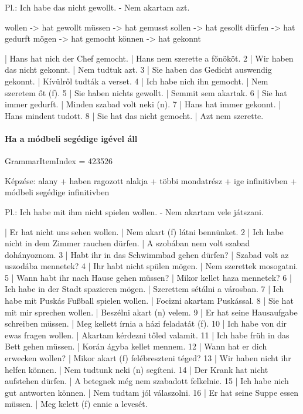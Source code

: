 \documentclass{article}
\newenvironment{desc}{\verbatim}{\endverbatim}
\newenvironment{exmp}{\verbatim}{\endverbatim}
\begin{document}
\begin{desc}
Pl.: Ich habe das nicht gewollt. - Nem akartam azt.

wollen -> hat gewollt
müssen -> hat gemusst
sollen -> hat gesollt
dürfen -> hat gedurft
mögen -> hat gemocht
können -> hat gekonnt
\end{desc}

\begin{exmp}
1 | Hans hat nich der Chef gemocht. | Hans nem szerette a főnököt.
2 | Wir haben das nicht gekonnt. | Nem tudtuk azt.
3 | Sie haben das Gedicht auswendig gekonnt. | Kívülről tudták a verset.
4 | Ich habe nich ihn gemocht. | Nem szeretem őt (f).
5 | Sie haben nichts gewollt. | Semmit sem akartak.
6 | Sie hat immer gedurft. | Minden szabad volt neki (n).
7 | Hans hat immer gekonnt. | Hans mindent tudott.
8 | Sie hat das nicht gemocht. | Azt nem szerette.
\end{exmp}

\paragraph{Ha a módbeli segédige igével áll}

GrammarItemIndex = 423526

\begin{desc}
Képzése:
alany + haben ragozott alakja + többi mondatrész + ige infinitivben + módbeli segédige infinitivben

Pl.: Ich habe mit ihm nicht spielen wollen. - Nem akartam vele játszani.
\end{desc}

\begin{exmp}
1 | Er hat nicht uns sehen wollen. | Nem akart (f) látni bennünket.
2 | Ich habe nicht in dem Zimmer rauchen dürfen. | A szobában nem volt szabad dohányoznom.
3 | Habt ihr in das Schwimmbad gehen dürfen? | Szabad volt az uszodába mennetek?
4 | Ihr habt nicht spülen mögen. | Nem szerettek mosogatni.
5 | Wann habt ihr nach Hause gehen müssen? | Mikor kellet haza mennetek?
6 | Ich habe in der Stadt spazieren mögen. | Szerettem sétálni a városban.
7 | Ich habe mit Puskás Fußball spielen wollen. | Focizni akartam Puskással.
8 | Sie hat mit mir sprechen wollen. | Beszélni akart (n) velem.
9 | Er hat seine Hausaufgabe schreiben müssen. | Meg kellett írnia a házi feladatát (f).
10 | Ich habe von dir ewas fragen wollen. | Akartam kérdezni tőled valamit.
11 | Ich habe früh in das Bett gehen müssen. | Korán ágyba kellet mennem.
12 | Wann hat er dich erwecken wollen? | Mikor akart (f) felébreszteni téged?
13 | Wir haben nicht ihr helfen können. | Nem tudtunk neki (n) segíteni.
14 | Der Krank hat nicht aufstehen dürfen. | A betegnek még nem szabadott felkelnie.
15 | Ich habe nich gut antworten können. | Nem tudtam jól válaszolni.
16 | Er hat seine Suppe essen müssen. | Meg kelett (f) ennie a levesét.
\end{exmp}
\end{document}
